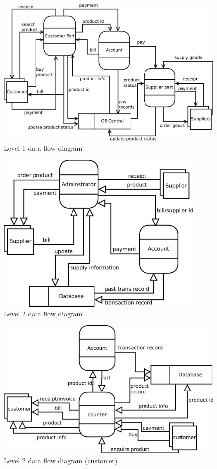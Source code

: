 \begin{figure}[h]\centering
  \includegraphics[width=5in]{fig/dfd-1}
  \caption{Level 1 data flow diagram}\label{fig:dfd-1}
\end{figure}

\begin{figure}[h]\centering
  \includegraphics[width=4in]{fig/dfd-2}
  \caption{Level 2 data flow diagram}\label{fig:dfd-2}
\end{figure}

\begin{figure}[h]\centering
  \includegraphics[width=5in]{fig/dfd-2-customer}
  \caption{Level 2 data flow diagram (customer)}\label{fig:dfd-2-customer}
\end{figure}

